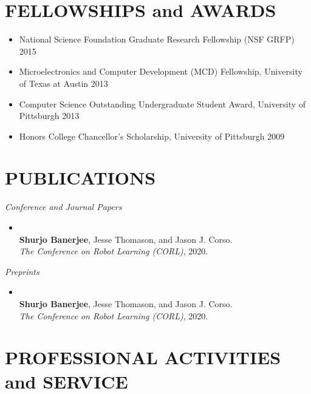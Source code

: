 \documentclass{res}
\newcommand{\citehref}[2]{\href{#1}{\color{darkblue}{#2}}}
\begin{document}
\begin{resume}
 \section{FELLOWSHIPS and AWARDS}

 \begin{itemize}
  \item National Science Foundation Graduate Research Fellowship (NSF GRFP) \hfill 2015
  \item Microelectronics and Computer Development (MCD) Fellowship, University of Texas at Austin \hfill 2013
  \item Computer Science Outstanding Undergraduate Student Award, University of Pittsburgh \hfill 2013
  \item Honors College Chancellor's Scholarship, University of Pittsburgh \hfill 2009
\end{itemize}

\section{PUBLICATIONS}

{\sl Conference and Journal Papers}
\begin{itemize}\item \citehref{https://arxiv.org/abs/2010.12639}{The RobotSlang Benchmark: Dialog-guided Robot Localization and Navigation}\\{\bf Shurjo Banerjee}, Jesse Thomason, and Jason J. Corso.\\\textit{The Conference on Robot Learning (CORL)}, 2020.
\end{itemize}{\sl Preprints}
\begin{itemize}\item \citehref{}{The RobotSlang Benchmark: Dialog-guided Robot Localization and Navigation}\\{\bf Shurjo Banerjee}, Jesse Thomason, and Jason J. Corso.\\\textit{The Conference on Robot Learning (CORL)}, 2020.
\end{itemize}

\section{PROFESSIONAL ACTIVITIES and SERVICE}


\end{resume}
\end{document}

